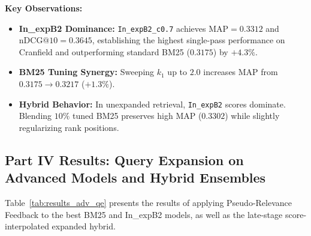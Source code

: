 \documentclass[10pt, a4paper]{article}
\begin{document}
\noindent \textbf{Key Observations:}
\begin{itemize}[noitemsep,topsep=2pt]
    \item \textbf{In\_expB2 Dominance:} \texttt{In\_expB2\_c0.7} achieves $\text{MAP} = \mathbf{0.3312}$ and $\text{nDCG@10} = \mathbf{0.3645}$, establishing the highest single-pass performance on Cranfield and outperforming standard BM25 ($0.3175$) by $+4.3\%$.
    \item \textbf{BM25 Tuning Synergy:} Sweeping $k_1$ up to $2.0$ increases MAP from $0.3175 \to 0.3217$ ($+1.3\%$).
    \item \textbf{Hybrid Behavior:} In unexpanded retrieval, \texttt{In\_expB2} scores dominate. Blending $10\%$ tuned BM25 preserves high MAP ($0.3302$) while slightly regularizing rank positions.
\end{itemize}

\subsection{Part IV Results: Query Expansion on Advanced Models and Hybrid Ensembles}
\label{sec:results_part4}

Table~\ref{tab:results_adv_qe} presents the results of applying Pseudo-Relevance Feedback to the best BM25 and In\_expB2 models, as well as the late-stage score-interpolated expanded hybrid.
\end{document}
